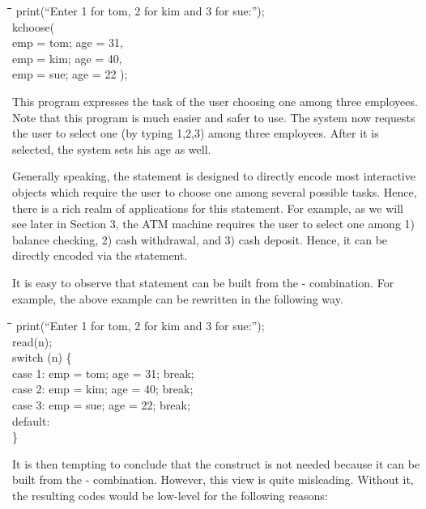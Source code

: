 \documentclass[letter]{ieice}
\newenvironment{exmple}{
 \begingroup \begin{tabbing} \hspace{2em}\= \hspace{3em}\= \hspace{3em}\=
\hspace{3em}\= \hspace{3em}\= \hspace{3em}\= \kill}{
 \end{tabbing}\endgroup}
\newcommand{\kch}{kchoose}
\begin{document}
\begin{exmple}
print(``Enter 1 for tom, 2 for kim and 3 for sue:''); \\
        \kch( \\
 \>           emp = tom;  age = 31, \\
  \>          emp = kim; age = 40, \\
 \>           emp = sue; age = 22 );
\end{exmple}

\noindent This program expresses the task of the user choosing one among
three employees.
 Note that this program is much easier and safer to use.
 The system now requests the user to select one (by typing 1,2,3)  
among three
employees. After it is selected, 
the system sets his age as well.

Generally speaking, the  statement is designed to directly encode most interactive objects
which require  the user to choose one among several possible tasks.
Hence, there is a rich realm of applications for this statement.
For example, as we will see later in Section 3, the ATM machine requires the user
to select one among 1) balance checking, 2) cash withdrawal, and 3) cash deposit.
Hence, it can be directly encoded via the  statement.


 It is easy to observe that   statement  can be built from the
 - combination. For example, the above example can be rewritten in the following way.

\begin{exmple}
print(``Enter 1 for tom, 2 for kim and 3 for sue:''); \\
        read(n); \\
        switch (n) \{ \\
 \>           case 1:  emp = tom; age = 31;   break; \\
  \>          case 2:  emp = kim; age = 40;   break;\\
 \>           case 3:  emp = sue; age = 22;    break;\\
 \>           default:           \\
        \}\\
\end{exmple}



   

 It is then tempting to conclude that the  construct is not needed because it can be built from the
 -
combination. However, this view is quite misleading. Without it, the resulting codes would be 
low-level for the following reasons: 
\end{document}
